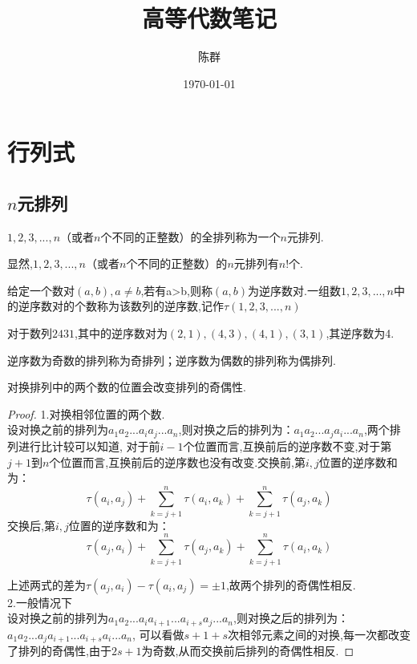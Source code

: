 \documentclass[blue,normal,cn]{elegantnote}
\title{高等代数笔记}
\author{陈群}
\date{\today}
\begin{document}
\tableofcontents
{\color{ecolor}{\maketitle}}


\section{行列式}
\subsection{$n$元排列}

\begin{definition}[$n$元排列]
$1,2,3,...,n$（或者$n$个不同的正整数）的全排列称为一个$n$元排列.
\end{definition}
显然,$1,2,3,...,n$（或者$n$个不同的正整数）的$n$元排列有$n!$个.

\begin{definition}[逆序数对和逆序数]
给定一个数对$(a,b),a ≠b $,若有a>b,则称$(a,b)$为逆序数对.一组数$1,2,3,...,n$中的逆序数对的个数称为该数列的逆序数,记作$τ(1,2,3,...,n)$
\end{definition}
对于数列$2431$,其中的逆序数对为$(2,1),(4,3),(4,1),(3,1)$,其逆序数为4.

\begin{definition}[奇排列与偶排列]
逆序数为奇数的排列称为奇排列；逆序数为偶数的排列称为偶排列.
\end{definition}

\begin{theorem}
对换排列中的两个数的位置会改变排列的奇偶性.
\end{theorem}

\begin{proof}
1.对换相邻位置的两个数.\\
设对换之前的排列为$a_1a_2...a_ia_j...a_n$,则对换之后的排列为：$a_1a_2...a_ja_i...a_n$,两个排列进行比计较可以知道,
对于前$i-1$个位置而言,互换前后的逆序数不变,对于第$j+1$到$n$个位置而言,互换前后的逆序数也没有改变.交换前,第$i,j$位置的逆序数和为：
\begin{equation*}
τ(a_i,a_j)+\sum_{k=j+1}^{n}\tau (a_i,a_k)+\sum_{k=j+1}^{n} \tau (a_j,a_k)
\end{equation*}
交换后,第$i,j$位置的逆序数和为：
\begin{equation*}
τ(a_j,a_i)+\sum_{k=j+1}^{n}\tau (a_j,a_k)+\sum_{k=j+1}^{n} \tau (a_i,a_k)
\end{equation*}

上述两式的差为$τ(a_j,a_i)-τ(a_i,a_j)=±1$,故两个排列的奇偶性相反.
\\
2.一般情况下\\
设对换之前的排列为$a_1a_2...a_ia_{i+1}...a_{i+s}a_j...a_n$,则对换之后的排列为：$a_1a_2...a_ja_{i+1}...a_{i+s}a_i...a_n$,
可以看做$s+1+s$次相邻元素之间的对换,每一次都改变了排列的奇偶性,由于$2s+1$为奇数,从而交换前后排列的奇偶性相反.
\end{proof}
\end{document}
